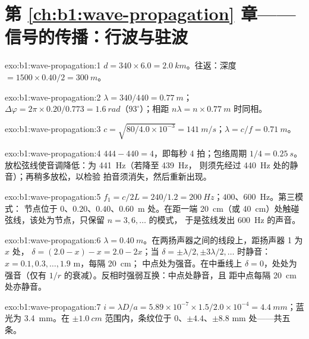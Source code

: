 \section*{第 \ref{ch:b1:wave-propagation} 章——信号的传播：行波与驻波}

\begin{solution}{exo:b1:wave-propagation:1}
$d = 340 \times 6.0 = \qty{2.0}{km}$。往返：深度 $= 1500 \times
0.40/2 = \qty{300}{m}$。
\end{solution}

\begin{solution}{exo:b1:wave-propagation:2}
$\lambda = 340/440 = \qty{0.77}{m}$；$\Delta\varphi = 2\pi \times
0.20/0.773 = \qty{1.6}{rad}$（$93^\circ$）；相距
$n\lambda = n \times \qty{0.77}{m}$ 时同相。
\end{solution}

\begin{solution}{exo:b1:wave-propagation:3}
$c = \sqrt{80/4.0\times10^{-3}} = \qty{141}{m/s}$；$\lambda = c/f =
\qty{0.71}{m}$。
\end{solution}

\begin{solution}{exo:b1:wave-propagation:4}
$444 - 440 = 4$，即每秒 4 拍；包络周期 $1/4 = \qty{0.25}{s}$。
放松弦线使音调降低：为 \qty{441}{Hz}（若降至 \qty{439}{Hz}，
则须先经过 \qty{440}{Hz} 处的静音）；再稍多放松，以检验
拍音须消失，然后重新出现。
\end{solution}

\begin{solution}{exo:b1:wave-propagation:5}
$f_1 = c/2L = 240/1.2 = \qty{200}{Hz}$；$400$、\qty{600}{Hz}。第三模式：
节点位于 $0$、$0.20$、$0.40$、\qty{0.60}{m} 处。在距一端 \qty{20}{cm}（或
\qty{40}{cm}）处触碰弦线，该处为节点，只保留 $n = 3, 6, \dots$ 的模式，
于是弦线发出 \qty{600}{Hz} 的声音。
\end{solution}

\begin{solution}{exo:b1:wave-propagation:6}
$\lambda = \qty{0.40}{m}$。在两扬声器之间的线段上，距扬声器 1 为 $x$ 处，
$\delta = (2.0 - x) - x = 2.0 - 2x$；当 $\delta = \pm\lambda/2,
\pm 3\lambda/2, \dots$ 时静音：$x = 0.1, 0.3, \dots, 1.9$ m，每隔 \qty{20}{cm}；
中点处为强音。在中垂线上 $\delta = 0$，处处为强音（仅有
$1/r$ 的衰减）。反相时强弱互换：中点处静音，且
距中点每隔 \qty{20}{cm} 处亦静音。
\end{solution}

\begin{solution}{exo:b1:wave-propagation:7}
$i = \lambda D/a = 5.89\times10^{-7} \times 1.5/2.0\times10^{-4} =
\qty{4.4}{mm}$；蓝光为 \qty{3.4}{mm}。在 $\pm\qty{1.0}{cm}$ 范围内，条纹位于
$0$、$\pm 4.4$、$\pm 8.8$ mm 处——共五条。
\end{solution}

